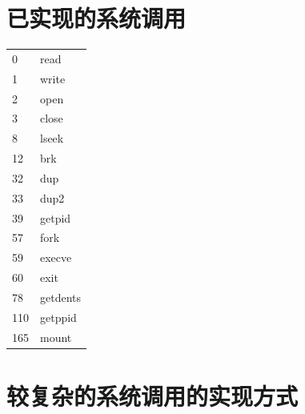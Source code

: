 \section{已实现的系统调用}
\label{sec:syscall}
\begin{tabular}{ll}
  0 & read \\
  1 & write \\
  2 & open \\
  3 & close \\
  8 & lseek \\
  12 & brk \\
  32 & dup \\
  33 & dup2 \\
  39 & getpid \\
  57 & fork \\
  59 & execve \\
  60 & exit \\
  78 & getdents \\
  110 & getppid \\
  165 & mount
\end{tabular}

\section{较复杂的系统调用的实现方式}
